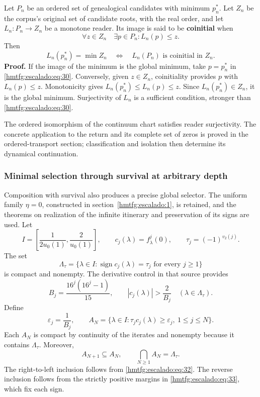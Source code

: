 Let \(P_n\) be an ordered set of genealogical candidates with minimum \(p_n^*\). Let \(Z_n\) be the corpus’s original set of candidate roots, with the real order, and let \(L_n:P_n\to Z_n\) be a monotone reader. Its image is said to be \textbf{coinitial} when
\begin{equation}
\forall z\in Z_n\quad\exists p\in P_n:
L_n(p)\le z.
\label{hmtfg:escalado:eq:30}
\end{equation}
Then
\begin{equation}
\boxed{L_n(p_n^*)=\min Z_n
\quad\Longleftrightarrow\quad
L_n(P_n)\text{ is coinitial in }Z_n.}
\label{hmtfg:escalado:eq:31}
\end{equation}
\textbf{Proof.} If the image of the minimum is the global minimum, take \(p=p_n^*\) in \eqref{hmtfg:escalado:eq:30}. Conversely, given \(z\in Z_n\), coinitiality provides \(p\) with \(L_n(p)\le z\). Monotonicity gives \(L_n(p_n^*)\le L_n(p)\le z\). Since \(L_n(p_n^*)\in Z_n\), it is the global minimum. Surjectivity of \(L_n\) is a sufficient condition, stronger than \eqref{hmtfg:escalado:eq:30}.

The ordered isomorphism of the continuum chart satisfies reader surjectivity. The concrete application to the return and its complete set of zeros is proved in the ordered-transport section; classification and isolation then determine its dynamical continuation.

\subsubsection{Minimal selection through survival at arbitrary depth}
\label{hmtfg:escalado:13.6}

Composition with survival also produces a precise global selector. The uniform family \(\eta=0\), constructed in section~\ref{hmtfg:escalado:1}, is retained, and the theorems on realization of the infinite itinerary and preservation of its signs are used. Let
\[
I=\left[\frac1{2u_0(1)},\frac2{u_0(1)}\right],\qquad
c_j(\lambda)=f_\lambda^j(0),\qquad
\tau_j=(-1)^{v_2(j)}.
\]
The set
\[
\Lambda_\tau=\{\lambda\in I:\operatorname{sign}c_j(\lambda)=\tau_j
\text{ for every }j\ge1\}
\]
is compact and nonempty. The derivative control in that source provides
\begin{equation}
B_j=\frac{16^j(16^j-1)}{15},\qquad
|c_j(\lambda)|>\frac2{B_j}\quad(\lambda\in\Lambda_\tau).
\label{hmtfg:escalado:eq:32}
\end{equation}
Define
\begin{equation}
\varepsilon_j=\frac1{B_j},\qquad
A_N=\{\lambda\in I:\tau_jc_j(\lambda)\ge\varepsilon_j,\
1\le j\le N\}.
\label{hmtfg:escalado:eq:33}
\end{equation}
Each \(A_N\) is compact by continuity of the iterates and nonempty because it contains \(\Lambda_\tau\). Moreover,
\begin{equation}
A_{N+1}\subseteq A_N,\qquad
\bigcap_{N\ge1}A_N=\Lambda_\tau.
\label{hmtfg:escalado:eq:34}
\end{equation}
The right-to-left inclusion follows from \eqref{hmtfg:escalado:eq:32}. The reverse inclusion follows from the strictly positive margins in \eqref{hmtfg:escalado:eq:33}, which fix each sign.

